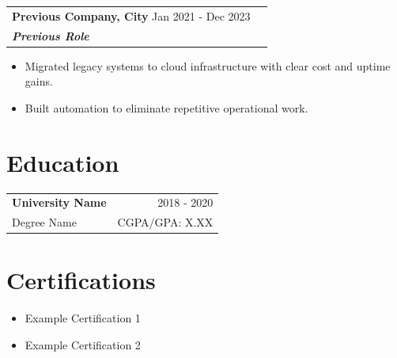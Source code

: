 \documentclass[a4paper,10pt]{article}
\begin{document}
\vspace{4pt}
\begin{tabularx}{\linewidth}{ @{}l r@{} }
\color[HTML]{1C033C} \textbf{Previous Company, City} \hfill \color[HTML]{371e77} Jan 2021 - Dec 2023 \\
\color[HTML]{371e77}\textbf{\textit{Previous Role}} \hfill \color[HTML]{371e77}\\[3pt]
\end{tabularx}
\begin{itemize}[nosep, leftmargin=2em, itemsep=2pt]
  \item Migrated legacy systems to cloud infrastructure with clear cost and uptime gains.
  \item Built automation to eliminate repetitive operational work.
\end{itemize}

\section{Education}
\begin{tabularx}{\linewidth}{ @{}l r@{} }
\color[HTML]{1C033C} \textbf{University Name} & \hfill \color[HTML]{371e77} 2018 - 2020 \\
\color[HTML]{371e77} Degree Name & \hfill \color[HTML]{371e77} CGPA/GPA: X.XX \\
\end{tabularx}

\section{Certifications}
\begin{itemize}[nosep, leftmargin=2em, itemsep=2pt]
  \item Example Certification 1
  \item Example Certification 2
\end{itemize}
\end{document}
